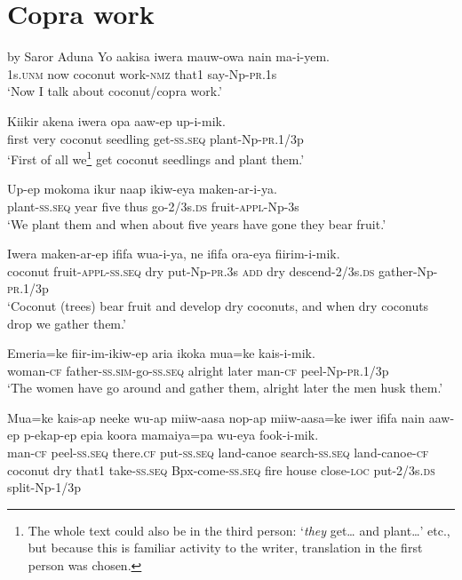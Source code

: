 \section{Copra work} 
   by Saror Aduna 
\ea
\gll  Yo  aakisa  iwera  mauw-owa  nain  ma-i-yem. \\
1s.\textsc{unm}  now  coconut  work-\textsc{nmz}  that1  say-Np-\textsc{pr}.1s \\ 
\glt ‘Now I talk about coconut/copra work.’ \\
\z


\ea
\gll  Kiikir  akena  iwera  opa  aaw-ep  up-i-mik. \\
first  very  coconut  seedling  get-\textsc{ss.seq}  plant-Np-\textsc{pr}.1/3p \\
\glt ‘First of all we\footnote{ The whole text could also be in the third person: ‘\textit{they} get… and plant…’  etc., but because this is familiar activity to the writer, translation in the first person was chosen.} get coconut seedlings and plant them.’ \\
\z


\ea
\gll  Up-ep  mokoma  ikur  naap  ikiw-eya  maken-ar-i-ya. \\
plant-\textsc{ss.seq}  year  five  thus  go-2/3s.\textsc{ds}  fruit-\textsc{appl}-Np-3s \\
\glt ‘We plant them and when about five years have gone they bear fruit.’ \\
\z


\ea
\gll  Iwera  maken-ar-ep  ififa  wua-i-ya,  ne  ififa  ora-eya            fiirim-i-mik. \\
coconut  fruit-\textsc{appl}-\textsc{ss.seq}  dry  put-Np-\textsc{pr}.3s  \textsc{add}  dry  descend-2/3s.\textsc{ds}  gather-Np-\textsc{pr}.1/3p \\


\glt ‘Coconut (trees) bear fruit and develop dry coconuts, and when dry coconuts drop we gather them.’ \\
\z


\ea
\gll  Emeria=ke  fiir-im-ikiw-ep  aria  ikoka  mua=ke  kais-i-mik. \\
woman-\textsc{cf}  father-\textsc{ss}.\textsc{sim}-go-\textsc{ss.seq}  alright  later  man-\textsc{cf}  peel-Np-\textsc{pr}.1/3p \\
\glt ‘The women have go around and gather them, alright later the men husk them.’ \\
\z


\ea
\gll  Mua=ke  kais-ap  neeke  wu-ap  miiw-aasa  nop-ap               miiw-aasa=ke  iwer  ififa  nain  aaw-ep  p-ekap-ep  epia  koora                    mamaiya=pa  wu-eya  fook-i-mik. \\
man-\textsc{cf}  peel-\textsc{ss.seq}  there.\textsc{cf}  put-\textsc{ss.seq}  land-canoe  search-\textsc{ss.seq} land-canoe-\textsc{cf}  coconut  dry  that1  take-\textsc{ss.seq}  Bpx-come-\textsc{ss.seq}  fire  house      close-\textsc{loc}  put-2/3s.\textsc{ds}  split-Np-1/3p \\




